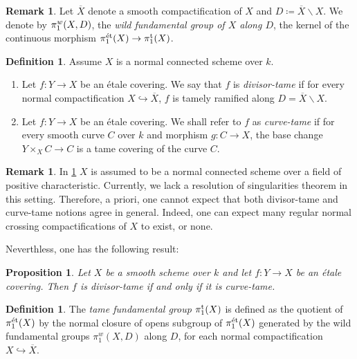\documentclass[10pt,a4paper]{amsart}
\numberwithin{equation}{subsection}
\theoremstyle{plain}
\newtheorem{prop}[theorem]{Proposition}
\theoremstyle{definition}
\newtheorem{defi}[theorem]{Definition}
\newtheorem{rema}[theorem]{Remark}
\theoremstyle{remark}
\numberwithin{equation}{section}
\begin{document}
\begin{rema} Let $\overline{X}$ denote a smooth compactification of $X$ and $D \coloneqq \overline{X} \backslash X.$
We denote by $\pi_1^w(X, D)$, the \emph{wild fundamental group of $X$ along $D$},
the kernel of the continuous morphism $ \pi_1^{\text{\'et}}(X) \to \pi_1^{\mathrm{t}}(X)$.
\end{rema}

\begin{defi} \label{}
Assume $X$ is a normal connected scheme over $k$.
\begin{enumerate}
\item Let $f \colon Y \to X$ be an \'etale covering. We say that $f$ is \emph{divisor-tame} if for every normal compactification
$X \hookrightarrow \overline{X}$, $f$ is tamely ramified along $D = \overline{X} \backslash X$.
\item Let $f \colon Y \to X$ be an \'etale covering. We shall refer to $f$ as \emph{curve-tame} if for every smooth curve $C$ over $k$ and morphism
$g \colon C \to X$, the base change $Y \times_{X} C \to C$ is a tame covering of the curve $C$.
\end{enumerate}
\end{defi}

\begin{rema}
In \cref{} $X$ is assumed to be a normal connected scheme over a field of positive characteristic. Currently, we lack a
resolution of singularities theorem in this
setting. Therefore, a priori, one cannot expect that both divisor-tame and curve-tame notions agree in general. Indeed, one can expect
many regular normal crossing compactifications of $X$ to exist, or none. 
\end{rema}

Neverthless, one has the following result:

\begin{prop}{\cite[Theorem 1.1]{kerz_tame}}
Let $X$ be a smooth scheme over $k$ and let $f \colon Y \to X$ be an \'etale covering. Then $f$ is divisor-tame if and only if it is curve-tame.
\end{prop}


\begin{defi}
The \emph{tame fundamental group} $\pi_1^{\mathrm{t}}(X)$ is defined as the quotient of $\pi_1^{\text{\'et}}(X)$ by the normal closure of
opens subgroup of $\pi_1^{\text{\'et}}(X)$ generated by the wild fundamental groups  $\pi_1^w(X, D)$ along $D$,
for each normal compactification $X \hookrightarrow \overline{X}$. 
\end{defi}
\end{document}
